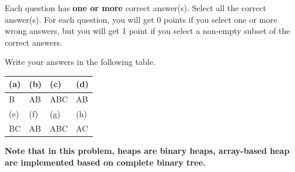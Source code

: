 
Each question has \textbf{one or more} correct answer(s). Select all the correct answer(s). For each question, you will get 0 points if you select one or more wrong answers, but you will get 1 point if you select a non-empty subset of the correct answers.

Write your answers in the following table.


\begin{table}[h]
\centering
\begin{tabular}{|p{1.5cm}|p{1.5cm}|p{1.5cm}|p{1.5cm}|}
        \hline
        (a) & (b) & (c) & (d)  \\
        \hline
          B  &  AB   &  ABC   &     AB     \\[0.7cm]
        \hline
        (e) & (f) & (g) & (h) \\
        \hline
          BC  &  AB   &  ABC   &     AC    \\[0.7cm]
        \hline
    \end{tabular}
\end{table}

\textbf{Note that in this problem, heaps are binary heaps, array-based heap are implemented based on complete binary tree.}

